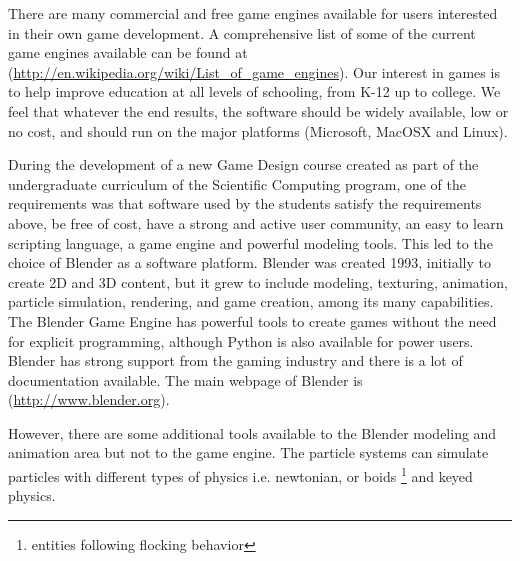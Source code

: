 


There are many commercial and free game engines available for users interested in their own game development. A comprehensive list of some of the current game engines available can be found at (\url{http://en.wikipedia.org/wiki/List\_of\_game\_engines}). Our interest in games is to help improve education at all levels of schooling, from K-12 up to college. We feel that whatever the end results, the software should be widely available, low or no cost, and should run on the major platforms (Microsoft, MacOSX and Linux). 




During the development of a new Game Design course created as part of the undergraduate curriculum of the Scientific Computing program, one of the requirements was that software used by the students satisfy the requirements above, be free of cost, have a strong and active user community, an easy to learn scripting language, a game engine and powerful modeling tools. This led to the choice of Blender as a software platform. Blender was created 1993, initially to create 2D and 3D content, but it grew to include modeling, texturing, animation, particle simulation, rendering, and game creation, among its many capabilities. The Blender Game Engine has powerful tools to create games without the need for explicit programming, although Python is also available for power users. Blender has strong support from the gaming industry and there is a lot of documentation available. The main webpage of Blender is (\url{http://www.blender.org}).  


However, there are some additional tools available to the Blender modeling and animation  area but not to the game engine. The particle systems can simulate particles with different types of physics i.e. newtonian, or boids \footnote{entities following flocking behavior} and keyed physics. 

